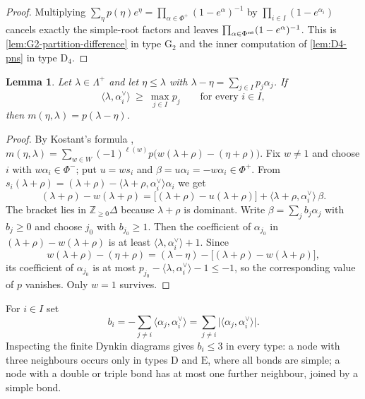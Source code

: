\documentclass[11pt]{article}
\newtheorem{lemma}[lemma]{Lemma}
\theoremstyle{definition}
\theoremstyle{remark}
\newcommand{\Raiz}{\Phi}
\newcommand{\RaizSimp}{\Delta}
\newcommand{\Pesos}{\Lambda}
\newcommand{\Weyl}{W}
\newcommand{\typeD}{\ensuremath{\mathrm{D}}}
\newcommand{\typeE}{\ensuremath{\mathrm{E}}}
\newcommand{\typeG}{\ensuremath{\mathrm{G}}}
\newcommand{\Z}{\mathbb Z}
\begin{document}
\begin{proof}
Multiplying $\sum_\eta p(\eta)e^\eta=\prod_{\alpha\in\Raiz^+}(1-e^\alpha)^{-1}$
by $\prod_{i\in I}(1-e^{\alpha_i})$ cancels exactly the simple-root factors
and leaves $\prod_{\alpha\in\Raiz^{\rm ns}}(1-e^{\alpha})^{-1}$.  This is
\cref{lem:G2-partition-difference} in type $\typeG_2$ and the inner
computation of \cref{lem:D4-pns} in type $\typeD_4$.
\end{proof}

\begin{lemma}\label{lem:kostant-stabilization}
Let $\lambda\in\Pesos^+$ and let $\eta\le\lambda$ with
$\lambda-\eta=\sum_{j\in I}p_j\alpha_j$.  If
\[
   \langle\lambda,\alpha_i^\vee\rangle\ \ge\ \max_{j\in I}p_j
   \qquad\text{for every }i\in I,
\]
then $m(\eta,\lambda)=p(\lambda-\eta)$.
\end{lemma}

\begin{proof}
By Kostant's formula \cite{MR0109192},
$m(\eta,\lambda)=\sum_{w\in\Weyl}(-1)^{\ell(w)}p\bigl(w(\lambda+\rho)-(\eta+\rho)\bigr)$.
Fix $w\ne1$ and choose $i$ with $w\alpha_i\in\Raiz^-$; put $u=ws_i$ and
$\beta=u\alpha_i=-w\alpha_i\in\Raiz^+$.  From
$s_i(\lambda+\rho)=(\lambda+\rho)-\langle\lambda+\rho,\alpha_i^\vee\rangle\alpha_i$
we get
\[
   (\lambda+\rho)-w(\lambda+\rho)
     =\bigl[(\lambda+\rho)-u(\lambda+\rho)\bigr]
      +\langle\lambda+\rho,\alpha_i^\vee\rangle\,\beta .
\]
The bracket lies in $\Z_{\ge0}\RaizSimp$ because $\lambda+\rho$ is dominant.
Write $\beta=\sum_j b_j\alpha_j$ with $b_j\ge0$ and choose $j_0$ with
$b_{j_0}\ge1$.  Then the coefficient of $\alpha_{j_0}$ in
$(\lambda+\rho)-w(\lambda+\rho)$ is at least
$\langle\lambda,\alpha_i^\vee\rangle+1$.  Since
\[
   w(\lambda+\rho)-(\eta+\rho)
     =(\lambda-\eta)-\bigl[(\lambda+\rho)-w(\lambda+\rho)\bigr],
\]
its coefficient of $\alpha_{j_0}$ is at most
$p_{j_0}-\langle\lambda,\alpha_i^\vee\rangle-1\le-1$, so the corresponding
value of $p$ vanishes.  Only $w=1$ survives.
\end{proof}

For $i\in I$ set
\begin{equation}\label{eq:b-constant}
   b_i=-\sum_{j\ne i}\langle\alpha_j,\alpha_i^\vee\rangle
      =\sum_{j\ne i}\bigl|\langle\alpha_j,\alpha_i^\vee\rangle\bigr| .
\end{equation}
Inspecting the finite Dynkin diagrams gives $b_i\le3$ in every type: a node
with three neighbours occurs only in types $\typeD$ and $\typeE$, where all
bonds are simple; a node with a double or triple bond has at most one further
neighbour, joined by a simple bond.
\end{document}
